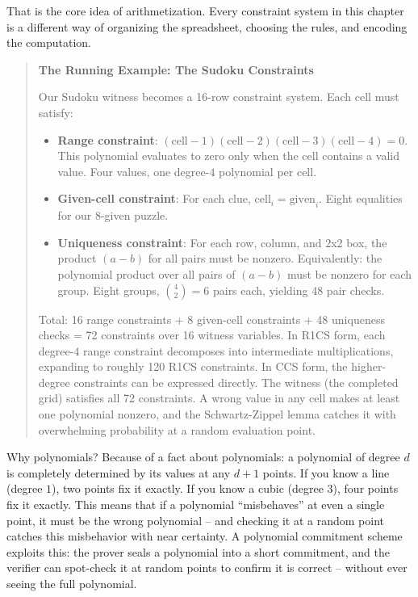 \documentclass[
  11pt,
  openany]{report}
\providecommand{\tightlist}{%
  \setlength{\itemsep}{0pt}\setlength{\parskip}{0pt}}
\renewcommand{\textbf}[1]{{\bfseries\color{MidnightBold}#1}}
\begin{document}
That is the core idea of arithmetization. Every constraint system in this
chapter is a different way of organizing the spreadsheet, choosing the rules,
and encoding the computation.

\begin{quote}
\textbf{The Running Example: The Sudoku Constraints}

Our Sudoku witness becomes a 16-row constraint system. Each cell must satisfy:

\begin{itemize}
\tightlist
\item
  \textbf{Range constraint}:
  \((\text{cell} - 1)(\text{cell} - 2)(\text{cell} - 3)(\text{cell} - 4) = 0\).
  This polynomial evaluates to zero only when the cell contains a valid value.
  Four values, one degree-\(4\) polynomial per cell.
\item
  \textbf{Given-cell constraint}: For each clue,
  \(\text{cell}_i = \text{given}_i\). Eight equalities for our 8-given puzzle.
\item
  \textbf{Uniqueness constraint}: For each row, column, and 2x2 box, the product
  \((a - b)\) for all pairs must be nonzero. Equivalently: the polynomial
  product over all pairs of \((a - b)\) must be nonzero for each group. Eight
  groups, \(\binom{4}{2} = 6\) pairs each, yielding 48 pair checks.
\end{itemize}

Total: 16 range constraints + 8 given-cell constraints + 48 uniqueness checks =
72 constraints over 16 witness variables. In R1CS form, each degree-\(4\) range
constraint decomposes into intermediate multiplications, expanding to roughly
120 R1CS constraints. In CCS form, the higher-degree constraints can be
expressed directly. The witness (the completed grid) satisfies all 72
constraints. A wrong value in any cell makes at least one polynomial nonzero,
and the Schwartz-Zippel lemma catches it with overwhelming probability at a
random evaluation point.
\end{quote}

Why polynomials? Because of a fact about polynomials: a polynomial of degree
\(d\) is completely determined by its values at any \(d+1\) points. If you know
a line (degree \(1\)), two points fix it exactly. If you know a cubic (degree
\(3\)), four points fix it exactly. This means that if a polynomial
``misbehaves'' at even a single point, it must be the wrong polynomial -- and
checking it at a random point catches this misbehavior with near certainty. A
polynomial commitment scheme exploits this: the prover seals a polynomial into a
short commitment, and the verifier can spot-check it at random points to confirm
it is correct -- without ever seeing the full polynomial.
\end{document}
